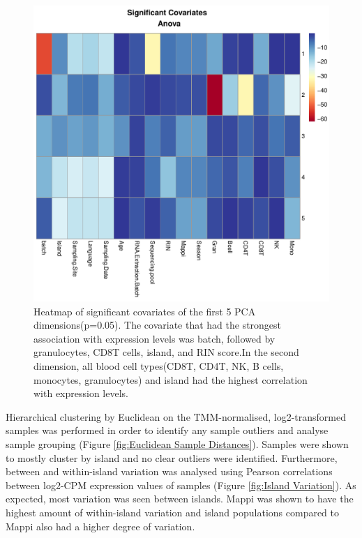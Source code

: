 \documentclass[12pt,a4paper,titlepage,twoside,openright]{book}
\begin{document}
\begin{mainmatter}
{{\begin{figure}[htb!]
\centering
\includegraphics[width=\textwidth,height=\textheight,keepaspectratio]{Figures/significantCovariates_AnovaHeatmap.pdf}
\caption{Heatmap of significant covariates of the first 5 PCA dimensions(p=0.05). The covariate that had the strongest association with expression levels was batch, followed by granulocytes, CD8T cells, island, and RIN score.In the second dimension, all blood cell types(CD8T, CD4T, NK, B cells, monocytes, granulocytes) and island had the highest correlation with expression levels.}
\label{fig:Significant Covariates}
\end{figure}

Hierarchical clustering by Euclidean on the TMM-normalised, log2-transformed samples was performed in order to identify any sample outliers and analyse sample grouping (﻿Figure \ref{fig:Euclidean Sample Distances}﻿). Samples were shown to mostly cluster by island and no clear outliers were identified. Furthermore, between and within-island variation was analysed using Pearson correlations between log2-CPM expression values of samples (﻿Figure \ref{fig:Island Variation}). As expected, most variation was seen between islands. Mappi was shown to have the highest amount of within-island variation and island populations compared to Mappi also had a higher degree of variation. 

}}
\end{mainmatter}
\end{document}
